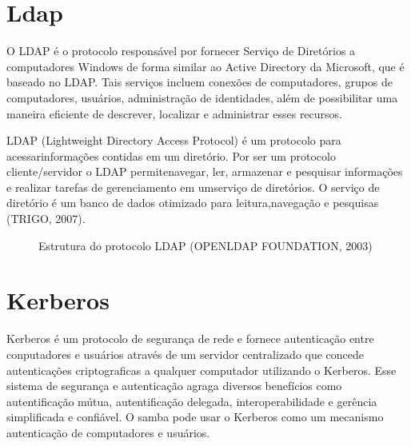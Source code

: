 \section{Ldap}

O LDAP é o protocolo responsável por fornecer Serviço de Diretórios a computadores Windows de forma similar ao Active Directory da Microsoft, que é baseado no LDAP. Tais serviços incluem conexões de computadores, grupos de computadores, usuários, administração de identidades, além de possibilitar uma maneira eficiente de descrever, localizar e administrar esses recursos.

LDAP (Lightweight Directory Access Protocol) é um protocolo para acessarinformações contidas em um diretório. Por ser um protocolo cliente/servidor o LDAP permitenavegar, ler, armazenar e pesquisar informações e realizar tarefas de gerenciamento em umserviço de diretórios. O serviço de diretório é um banco de dados otimizado para leitura,navegação e pesquisas (TRIGO, 2007).

\begin{figure}[ht]
   	\centering
   	\caption{Estrutura do protocolo LDAP (OPENLDAP FOUNDATION, 2003)}
    \label{ldap}
\end{figure}

\section{Kerberos}

Kerberos é um protocolo de segurança de rede e fornece autenticação entre conputadores e usuários através de um servidor centralizado que concede autenticações criptograficas a qualquer computador utilizando o Kerberos. Esse sistema de segurança e autenticação agraga diversos benefícios como autentificação mútua, autentificação delegada, interoperabilidade e gerência simplificada e confiável. O samba pode usar o Kerberos como um mecanismo autenticação de computadores e usuários.

